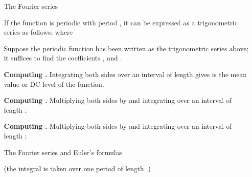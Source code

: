 \begin{EMtheorem}{The Fourier series}

If the function  is periodic with period \EMim{2\pi}, it can be expressed as a trigonometric series as follows:
where

\end{EMtheorem}

\begin{EMproof}{}

Suppose the periodic function has been written as the trigonometric series above; it suffices to find the coefficients ,  and .

\textbf{Computing .} Integrating both sides over an interval of length \EMim{2\pi} gives
 is the mean value or DC level of the function.

\textbf{Computing .} Multiplying both sides by  and integrating over an interval of length \EMim{2\pi}:

\textbf{Computing .} Multiplying both sides by  and integrating over an interval of length \EMim{2\pi}:

\end{EMproof}

\begin{EMimportant}{The Fourier series and Euler's formulas}

(the integral is taken over one period of length \EMim{2\pi}.)

\end{EMimportant}

